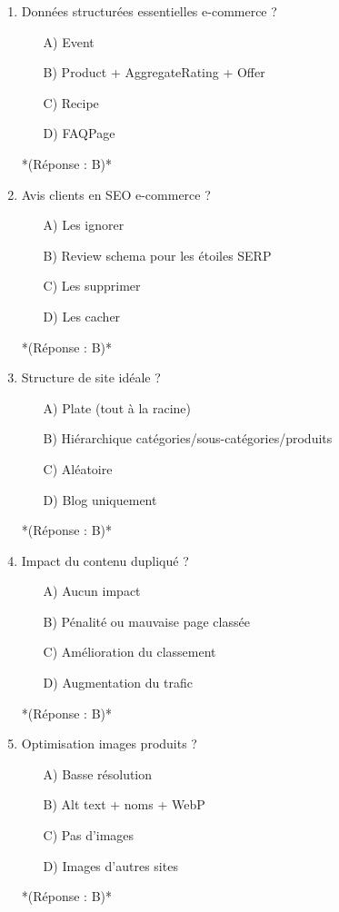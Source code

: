 \documentclass[12pt,a4paper,twoside]{report}
\begin{document}
\begin{enumerate}
\item Données structurées essentielles e-commerce ?
\begin{itemize}
\item[A)] Event
\item[B)] Product + AggregateRating + Offer
\item[C)] Recipe
\item[D)] FAQPage
\end{itemize}
*(Réponse : B)*

\item Avis clients en SEO e-commerce ?
\begin{itemize}
\item[A)] Les ignorer
\item[B)] Review schema pour les étoiles SERP
\item[C)] Les supprimer
\item[D)] Les cacher
\end{itemize}
*(Réponse : B)*

\item Structure de site idéale ?
\begin{itemize}
\item[A)] Plate (tout à la racine)
\item[B)] Hiérarchique catégories/sous-catégories/produits
\item[C)] Aléatoire
\item[D)] Blog uniquement
\end{itemize}
*(Réponse : B)*

\item Impact du contenu dupliqué ?
\begin{itemize}
\item[A)] Aucun impact
\item[B)] Pénalité ou mauvaise page classée
\item[C)] Amélioration du classement
\item[D)] Augmentation du trafic
\end{itemize}
*(Réponse : B)*

\item Optimisation images produits ?
\begin{itemize}
\item[A)] Basse résolution
\item[B)] Alt text + noms + WebP
\item[C)] Pas d'images
\item[D)] Images d'autres sites
\end{itemize}
*(Réponse : B)*


\end{enumerate}
\end{document}
